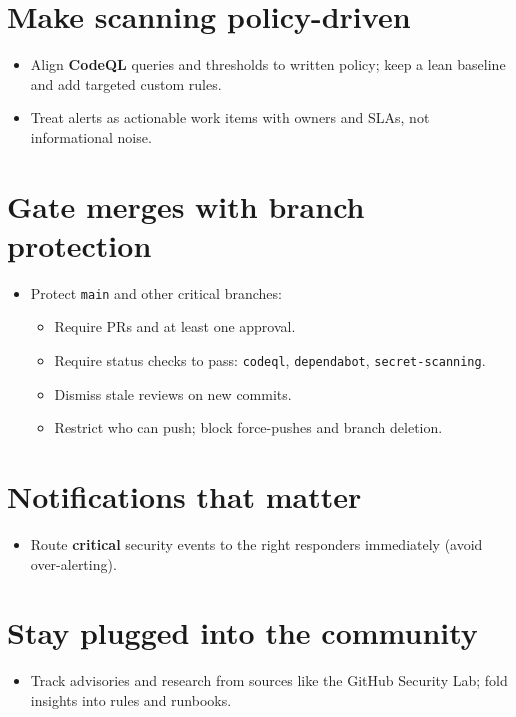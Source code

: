 \documentclass[11pt]{article}
\begin{document}
\section{Make scanning policy-driven}

\begin{itemize}
  \item Align \textbf{CodeQL} queries and thresholds to written policy; keep a lean baseline and add targeted custom rules.
  \item Treat alerts as actionable work items with owners and SLAs, not informational noise.
\end{itemize}

\section{Gate merges with branch protection}

\begin{itemize}
  \item Protect \texttt{main} and other critical branches:
  \begin{itemize}
    \item Require PRs and at least one approval.
    \item Require status checks to pass: \texttt{codeql}, \texttt{dependabot}, \texttt{secret-scanning}.
    \item Dismiss stale reviews on new commits.
    \item Restrict who can push; block force-pushes and branch deletion.
  \end{itemize}
\end{itemize}

\section{Notifications that matter}

\begin{itemize}
  \item Route \textbf{critical} security events to the right responders immediately (avoid over-alerting).
\end{itemize}

\section{Stay plugged into the community}

\begin{itemize}
  \item Track advisories and research from sources like the GitHub Security Lab; fold insights into rules and runbooks.
\end{itemize}
\end{document}
